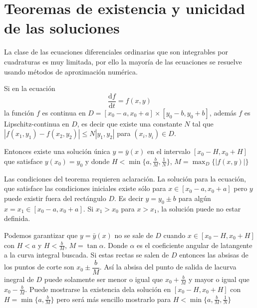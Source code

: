 \section{Teoremas de existencia y unicidad de las soluciones}

La clase de las ecuaciones diferenciales ordinarias que son integrables por cuadraturas es muy limitada, por ello la mayor\'ia de las ecuaciones se resuelve usando m\'etodos de aproximaci\'on num\'erica.


\begin{teorema}
Si en la ecuaci\'on
$$
\dfrac{\mathrm{d}f}{\mathrm{d}t}=f(x,y)
$$
la funci\'on
$f$ es continua en $D=\left[x_0-a,x_0+a\right]\times\left[y_0-b,y_0+b\right]$, adem\'as $f$ es Lipschitz-continua en $D$, es decir que existe una constante $N$ tal que $|f(x_1,y_1)-f(x_2,y_2)|\leq N|y_1,y_2|$ para $(x_i,y_i)\in D$.

Entonces existe una soluci\'on \'unica $y=\bar{y}(x)$ en el intervalo $\left[x_0-H,x_0+H\right]$ que satisface $y(x_0)=y_0$ y donde $H<\min\{a,\frac{b}{M},\frac{1}{N}\}$, $M=\max_{D}\{|f(x,y)|\} $
\end{teorema}


Las condiciones del teorema  requieren aclaraci\'on. La soluci\'on para la ecuaci\'on, que satisface las condiciones iniciales  existe s\'olo para $x\in [x_0-a,x_0+a]$ pero $y$ puede existir fuera del rect\'angulo $D$. Es decir $y=y_0\pm b$ para alg\'un $x=x_1\in[x_0-a,x_0+a]$. Si $x_1>x_0$ para $x>x_1$, la soluci\'on puede no estar definida.

Podemos garantizar que $y=\bar{y}(x)$ no se sale de $D$ cuando $x\in[x_0-H,x_0+H]$ con $H<a$ y $H<\frac{b}{M}$, $M=\tan\alpha$. Donde $\alpha$ es el coeficiente angular de latangente a la curva integral buscada. Si estas rectas se salen de $D$ entonces las absisas de los puntos de corte son $x_0\pm\dfrac{b}{M}$. As\'i la absisa  del punto de salida de lacurva inegral de $D$ puede solamente ser menor o igual que $x_0+\frac{b}{M}$ y mayor o igual que $x_0-\frac{b}{M}$. Puede mostrarse la existencia  dela soluci\'on en $[x_0-H,x_0+H]$ con $H=\min\{a,\frac{b}{M}\}$ pero ser\'a m\'as sencillo mostrarlo para $H<\min\{a,\frac{b}{M},\frac{1}{N}\}$

\begin{figure}[H]
\centering
{}
    \caption{}
    \label{fig:my_label}
\end{figure}

